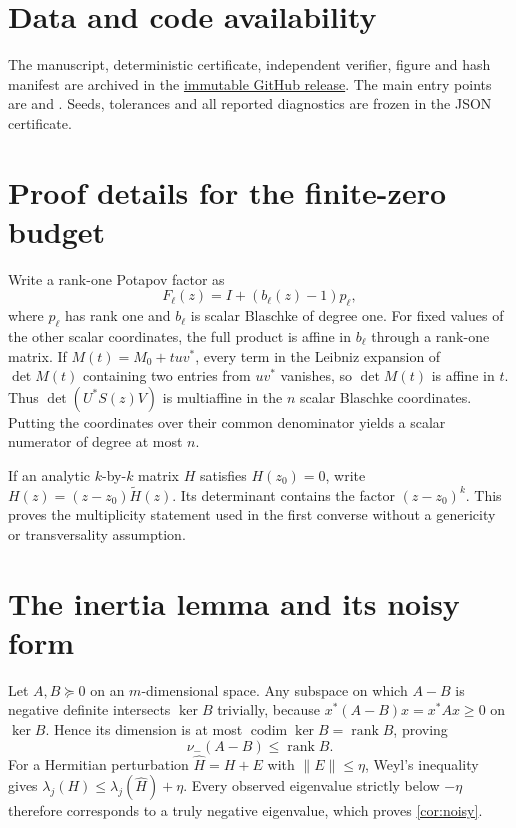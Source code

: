 \documentclass[11pt]{article}
\theoremstyle{definition}
\theoremstyle{remark}
\newcommand{\rank}{\operatorname{rank}}
\newcommand{\nminus}{\nu_{-}}
\newcommand{\norm}[1]{\lVert#1\rVert}
\begin{document}
\section*{Data and code availability}

The manuscript, deterministic certificate, independent verifier, figure and
hash manifest are archived in the
\href{https://github.com/lluiseriksson/finite-sample-spectral-certificates/releases/tag/v2.1-global-fanout-memory-submission}{immutable GitHub release}.  The main entry points are
 and
.  Seeds, tolerances and
all reported diagnostics are frozen in the JSON certificate.

\appendix

\section{Proof details for the finite-zero budget}

Write a rank-one Potapov factor as
\[
                  F_\ell(z)=I+(b_\ell(z)-1)p_\ell,
\]
where $p_\ell$ has rank one and $b_\ell$ is scalar Blaschke of degree one.
For fixed values of the other scalar coordinates, the full product is affine
in $b_\ell$ through a rank-one matrix.  If $M(t)=M_0+tuv^*$, every term in
the Leibniz expansion of $\det M(t)$ containing two entries from $uv^*$
vanishes, so $\det M(t)$ is affine in $t$.  Thus
$\det(U^*S(z)V)$ is multiaffine in the $n$ scalar Blaschke coordinates.
Putting the coordinates over their common denominator yields a scalar
numerator of degree at most $n$.

If an analytic $k$-by-$k$ matrix $H$ satisfies $H(z_0)=0$, write
$H(z)=(z-z_0)\widetilde H(z)$.  Its determinant contains the factor
$(z-z_0)^k$.  This proves the multiplicity statement used in the first
converse without a genericity or transversality assumption.

\section{The inertia lemma and its noisy form}

Let $A,B\succeq0$ on an $m$-dimensional space.  Any subspace on which
$A-B$ is negative definite intersects $\ker B$ trivially, because
$x^*(A-B)x=x^*Ax\ge0$ on $\ker B$.  Hence its dimension is at most
$\operatorname{codim}\ker B=\rank B$, proving
\[
                         \nminus(A-B)\le\rank B.
\]
For a Hermitian perturbation $\widehat H=H+E$ with $\norm E\le\eta$,
Weyl's inequality gives
$\lambda_j(H)\le\lambda_j(\widehat H)+\eta$.  Every observed eigenvalue
strictly below $-\eta$ therefore corresponds to a truly negative eigenvalue,
which proves \cref{cor:noisy}.
\end{document}
